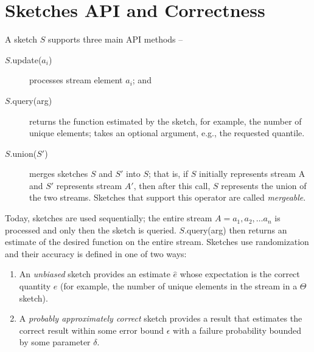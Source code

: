 \section{Sketches API and Correctness}
\label{sec:api}


A sketch $S$ supports three main API methods -- 
\begin{description}
\item[$S$.update($a_i$)] processes stream element $a_i$; and 
\item[$S$.query(arg)] returns the function estimated by the sketch, for example, the number of unique elements; 
 takes an optional argument, e.g., the requested quantile.
 \item[$S$.union($S'$)] merges sketches $S$ and $S'$ into $S$; that is, if $S$ initially represents stream A and $S'$ 
 represents stream $A'$, then after this call, $S$ represents the union of the two streams. 
 Sketches that support this operator are called \emph{mergeable}.
\end{description}

Today, sketches are used sequentially; the entire stream $A = a_1, a_2, \dots a_n$ is processed 
and only then the sketch is queried. $S$.query(arg) then returns an estimate of the desired function 
on the entire stream. 
Sketches use randomization and their accuracy is defined in one of two ways:
\begin{enumerate}
\item An \emph{unbiased} sketch provides an estimate  $\hat{e}$ whose expectation is the correct quantity $e$ 
(for example, the number of unique elements in the stream in a $\Theta$ sketch).  
\item A \emph{probably approximately correct} sketch provides a result that estimates the correct result
within some error bound $\epsilon$ with a failure probability bounded by some parameter $\delta$.  

\end{enumerate} 

